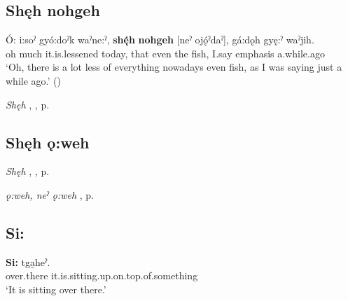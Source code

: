 \subsection*{\textbf{Shęh nohgeh} } \label{p:[shęh nohgeh]}

\ea
\label{ex:spart45}
\gll Ó: i:soˀ gyó:doˀk waˀne:ˀ, \textbf{shę́h} \textbf{nohgeh} [neˀ ojǫ́ˀdaˀ], gá:dǫh gyę:ˀ waˀjih.\\
oh much it.is.lessened today, that even the fish, I.say emphasis a.while.ago\\
\glt ‘Oh, there is a lot less of everything nowadays even fish, as I was saying just a while ago.’ (\cite{mithun_how_1980})
\z

\begin{CayugaRelated}
\item \textit{Shęh} , , p. \pageref{p:[shęh] `that’}
\end{CayugaRelated}

\subsection*{\textbf{Shęh ǫ:weh} } \label{p:[shęh ǫ:weh] ‘it is really’}

\begin{CayugaRelated}
\item \textit{Shęh} , , p. \pageref{p:[shęh] `that’}\\
\item \textit{ǫ:weh, neˀ ǫ:weh} , p. \pageref{p:[ǫ:weh, neˀ ǫ:weh]}
\end{CayugaRelated}

\subsection*{\textbf{Si:} } \label{p:[si:]}

\ea
\label{ex:spart46}
\gll \textbf{Si:} tga̱heˀ.\\
over.there it.is.sitting.up.on.top.of.something\\
\glt ‘It is sitting over there.’
\z

